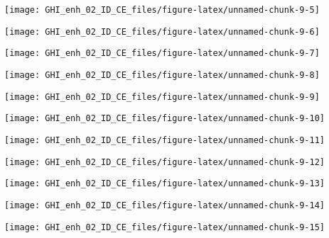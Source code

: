 \documentclass[
  10pt,
  a4paper,oneside]{article}
\begin{document}
\begin{center}\texttt{[image: GHI\_enh\_02\_ID\_CE\_files/figure-latex/unnamed-chunk-9-5]} \end{center}

\begin{center}\texttt{[image: GHI\_enh\_02\_ID\_CE\_files/figure-latex/unnamed-chunk-9-6]} \end{center}

\begin{center}\texttt{[image: GHI\_enh\_02\_ID\_CE\_files/figure-latex/unnamed-chunk-9-7]} \end{center}

\begin{center}\texttt{[image: GHI\_enh\_02\_ID\_CE\_files/figure-latex/unnamed-chunk-9-8]} \end{center}

\begin{center}\texttt{[image: GHI\_enh\_02\_ID\_CE\_files/figure-latex/unnamed-chunk-9-9]} \end{center}

\begin{center}\texttt{[image: GHI\_enh\_02\_ID\_CE\_files/figure-latex/unnamed-chunk-9-10]} \end{center}

\begin{center}\texttt{[image: GHI\_enh\_02\_ID\_CE\_files/figure-latex/unnamed-chunk-9-11]} \end{center}

\begin{center}\texttt{[image: GHI\_enh\_02\_ID\_CE\_files/figure-latex/unnamed-chunk-9-12]} \end{center}

\begin{center}\texttt{[image: GHI\_enh\_02\_ID\_CE\_files/figure-latex/unnamed-chunk-9-13]} \end{center}

\begin{center}\texttt{[image: GHI\_enh\_02\_ID\_CE\_files/figure-latex/unnamed-chunk-9-14]} \end{center}

\begin{center}\texttt{[image: GHI\_enh\_02\_ID\_CE\_files/figure-latex/unnamed-chunk-9-15]} \end{center}
\end{document}
